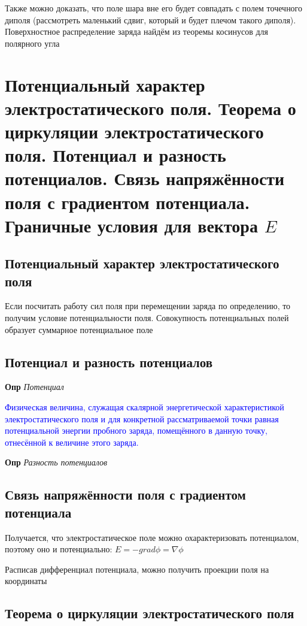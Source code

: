 \documentclass[a4paper, 14pt]{article}
\begin{document}
    Также можно доказать, что поле шара вне его будет совпадать с полем точечного диполя (рассмотреть маленький сдвиг,
    который и будет плечом такого диполя).
    Поверхностное распределение заряда найдём из теоремы косинусов для полярного угла
    
    \section{Потенциальный характер электростатического поля.
    Теорема о циркуляции электростатического поля.
    Потенциал и разность потенциалов.
    Связь напряжённости поля с градиентом потенциала.
    Граничные условия для вектора $E$}
    
    \subsection{Потенциальный характер электростатического поля}
    
    Если посчитать работу сил поля при перемещении заряда по определению, то получим условие потенциальности поля.
    Совокупность потенциальных полей образует суммарное потенциальное поле
    
    \subsection{Потенциал и разность потенциалов}
    
    \textbf{Опр} \textit{Потенциал}
    
    \textcolor{blue}{Физическая величина, служащая скалярной энергетической характеристикой электростатического поля
    и для конкретной рассматриваемой точки равная потенциальной энергии пробного заряда, помещённого в данную
    точку, отнесённой к величине этого заряда.}
    
    \textbf{Опр} \textit{Разность потенциалов}
    
    \subsection{Связь напряжённости поля с градиентом потенциала}
    
    Получается, что электростатическое поле можно охарактеризовать потенциалом, поэтому оно и потенциально:
    $E = -grad \phi = \nabla \phi$
    
    Расписав дифференциал потенциала, можно получить проекции поля на координаты
    
    \subsection{Теорема о циркуляции электростатического поля}
    
\end{document}
